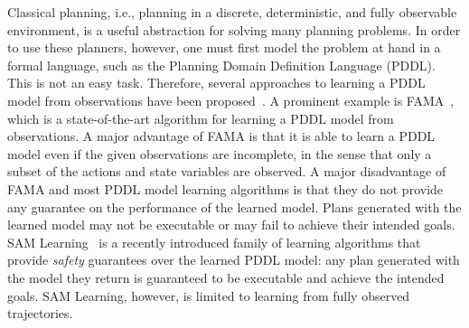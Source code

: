 \documentclass[letterpaper]{article} %
\begin{document}
Classical planning, i.e., planning in a discrete, deterministic, and fully observable environment, is a useful abstraction for solving many planning problems.
In order to use these planners, however, one must first model the problem at hand in a formal language, such as the Planning Domain Definition Language (PDDL). This is not an easy task. Therefore, several approaches to learning a PDDL model from observations have been proposed~\citep{aineto2019learning,stern2017efficientAndSafe,juba2021safe,cresswell2013acquiring,wu2007arms}. A prominent example is FAMA~\citep{aineto2019learning}, which is a state-of-the-art algorithm for learning a PDDL model from observations. A major advantage of FAMA is that it is able to learn a PDDL model even if the given observations are incomplete, in the sense that only a subset of the actions and state variables are observed. 
A major disadvantage of FAMA and most PDDL model learning algorithms is that they do not provide any guarantee on the performance of the learned model. 
Plans generated with the learned model may not be executable or may fail to achieve their intended goals. 
SAM Learning~\citep{stern2017efficientAndSafe,juba2021safe,juba2022learning,mordoch2022collaborative} is a recently introduced family of learning algorithms that provide \emph{safety} guarantees over the learned PDDL model: any plan generated with the model they return is guaranteed to be executable and achieve the intended goals. 
SAM Learning, however, is limited to learning from fully observed trajectories. 
\end{document}
